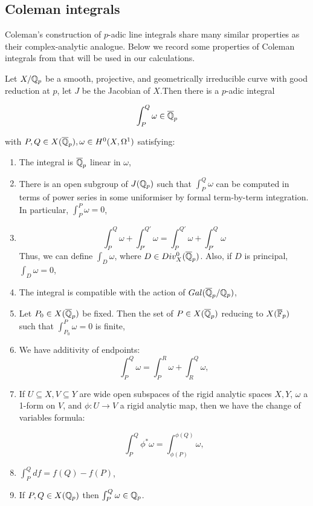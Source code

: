 \subsection{Coleman integrals}\label{sec:coleman_integration}

Coleman's construction of $p$-adic line integrals share many similar properties as their complex-analytic analogue. Below we record some properties of Coleman integrals from \cite{Coleman1,coleman85} that will be used in our calculations.

\begin{theorem} \label{coleman_def}
Let $X/\mathbb{Q}_p$ be a smooth, projective, and geometrically irreducible curve with good reduction at $p$, let $J$ be the Jacobian of $X$.Then there is a $p$-adic integral 

\[ \int_P^Q \omega \in \overline{\mathbb{Q}}_p\]

with $P,Q \in X(\overline{\mathbb{Q}}_p), \omega \in H^0(X,\Omega^1)$ satisfying:

\begin{enumerate}
    \item The integral is $\overline{\mathbb{Q}}_p$ linear in $\omega$,
    \item There is an open subgroup of $J(\mathbb{Q}_p)$ such that $\int_P^Q \omega$ can be computed in terms of power series in some uniformiser by formal term-by-term integration. In particular, $\int_P^P \omega = 0$,
    \item 
    \begin{equation*}
        \int_P^Q \omega + \int_{P'}^{Q'} \omega = \int_P^{Q'} \omega + \int_{P'}^Q \omega
    \end{equation*}
        Thus, we can define $\int_D \omega$, where $D \in Div^0_X(\overline{\mathbb{Q}}_p)$. Also, if $D$ is principal, $\int_D \omega = 0$,
        \item The integral is compatible with the action of $Gal(\overline{\mathbb{Q}}_p/\mathbb{Q}_p)$,
        \item Let $P_0 \in X(\overline{\mathbb{Q}}_p)$ be fixed. Then the set of $P \in X(\overline{\mathbb{Q}}_p)$ reducing to $X(\overline{\mathbb{F}}_p)$ such that $\int_{P_0}^P \omega = 0$ is finite,
        \item We have additivity of endpoints:
        \begin{equation*}
            \int_P^Q \omega = \int_P^R \omega + \int_R^Q \omega,
        \end{equation*}
        \item If $U \subseteq X, V \subseteq Y $ are wide open subspaces of the rigid analytic spaces $X,Y$, $\omega$ a 1-form on $V$, and $\phi:U \rightarrow V$ a rigid analytic map, then we have the change of variables formula:
        
        \begin{equation*}
            \int_P^Q \phi^* \omega = \int_{\phi(P)}^{\phi(Q)} \omega,
        \end{equation*}
        \item $\int_P^Q df = f(Q) - f(P)$,
        \item If $P,Q \in X(\mathbb{Q}_p)$ then $\int_P^Q \omega \in \mathbb{Q}_p$.
\end{enumerate}
\end{theorem}

